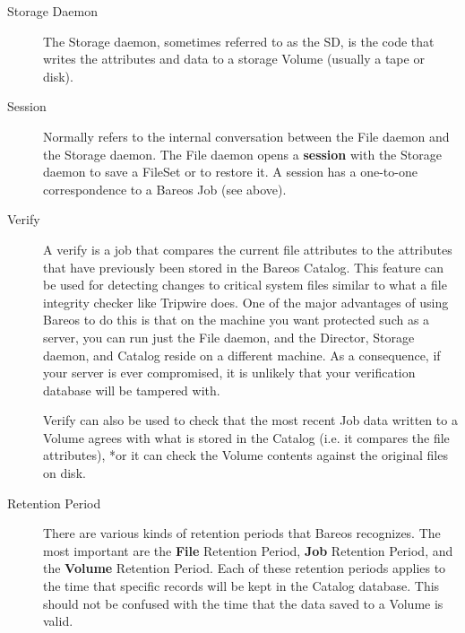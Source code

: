 \begin{description}
\item [Storage Daemon]
   The Storage daemon, sometimes referred to as the SD, is the code that
   writes the attributes and data to a storage Volume (usually a tape or
   disk).

\item [Session]
   Normally refers to the internal conversation between the File daemon and
   the Storage daemon.  The File daemon opens a {\bf session} with the
   Storage daemon to save a FileSet or to restore it.  A session has a
   one-to-one correspondence to a Bareos Job (see above).

\item [Verify]
   A verify is a job that compares the current file attributes to the
   attributes that have previously been stored in the Bareos Catalog.  This
   feature can be used for detecting changes to critical system files
   similar to what a file integrity checker like Tripwire does.
   One of the major advantages of
   using Bareos to do this is that on the machine you want protected such
   as a server, you can run just the File daemon, and the Director, Storage
   daemon, and Catalog reside on a different machine.  As a consequence, if
   your server is ever compromised, it is unlikely that your verification
   database will be tampered with.

   Verify can also be used to check that the most recent Job data written
   to a Volume agrees with what is stored in the Catalog (i.e.  it compares
   the file attributes), *or it can check the Volume contents against the
   original files on disk.


\item [Retention Period]
   There are various kinds of retention periods that Bareos recognizes.
   The most important are the {\bf File} Retention Period, {\bf Job}
   Retention Period, and the {\bf Volume} Retention Period.  Each of these
   retention periods applies to the time that specific records will be kept
   in the Catalog database.  This should not be confused with the time that
   the data saved to a Volume is valid.


\end{description}
